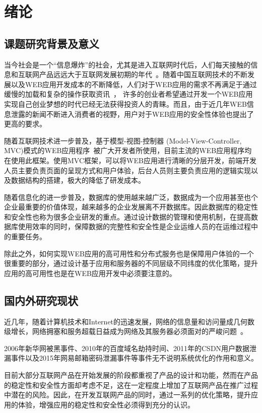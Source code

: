 \chapter{绪论}
\label{cha:introduction}
\section{课题研究背景及意义}
当今社会是一个“信息爆炸”的社会，尤其是进入互联网时代后，人们每天接触的信息和互联网产品远远大于互联网发展初期的年代~\cite{林薇2015基于}。随着中国互联网技术的不断发展以及WEB应用开发成本的不断降低，人们对于WEB应用的需求不再满足于通过缓慢的加载和复杂的操作获取资讯~\cite{贺海梁2012基于}，
许多的创业者希望通过开发一个WEB应用实现自己创业梦想的时代已经无法获得投资人的青睐。而且，由于近几年WEB信息泄露的新闻不断进入消费者的视野，用户对于WEB应用的安全性体验也提出了更高的要求。

随着互联网技术进一步普及，基于模型-视图-控制器
(Model-View-Controller, MVC)模式的WEB应用程序~\cite{张2010基于}被广大开发者所使用，目前主流的WEB应用程序均在使用此框架。使用MVC框架，可以将WEB应用进行清晰的分层开发，前端开发人员主要负责页面的呈现方式和用户体验，后台人员则主要负责应用的逻辑实现以及数据结构的搭建，极大的降低了研发成本。

随着信息化的进一步普及，数据库的使用越来越广泛，数据成为一个应用甚至也个企业最重要的价值体现，越来越多的企业发展离不开数据库。因此数据库的稳定性和安全性也称为很多企业研发的重点。通过设计数据的管理和使用机制，在提高数据库使用效率的同时，保障数据的完整性和安全性是企业运维人员的在运维过程中的重要任务。

除此之外，如何实现WEB应用的高可用性和分布式服务也是保障用户体验的一个很重要的部分，通过设计基于应用和服务器的不同层级不同纬度的优化策略，提升应用的高可用性也是在WEB应用开发中必须要注意的。

\section{国内外研究现状}
近几年，随着计算机技术和Internet的迅速发展，网络的信息量和访问量成几何数级增长，网络拥塞和服务超载日益成为网络及其服务器必须面对的严峻问题~\cite{王霜2004web}。

2006年新华网被黑事件、2010年的百度域名劫持时间、2011年的CSDN用户数据泄漏事件以及2015年网易邮箱密码泄漏事件等事件无不说明系统优化的作用和意义。

目前大部分互联网产品在开始发展的阶段都重视了产品的设计和功能，然而在产品的稳定性和安全性方面却考虑不足，这在一定程度上增加了互联网产品在推广过程中潜在的风险。因此，在开发互联网产品的同时，通过一系列的优化策略，提升应用的体验，增强应用的稳定性和安全性必须得到充分的认识。

